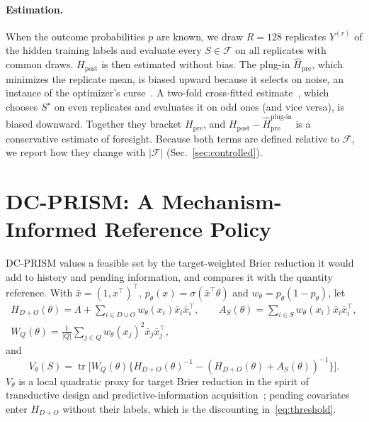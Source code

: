 \documentclass[runningheads]{llncs}
\begin{document}
\paragraph{Estimation.} When the outcome probabilities $p$ are known, we draw $R=128$ replicates $Y^{(r)}$ of the hidden training labels and evaluate every $S\in\mathcal F$ on all replicates with common draws. $H_{\mathrm{post}}$ is then estimated without bias. The plug-in $\widehat H_{\mathrm{pre}}$, which minimizes the replicate mean, is biased upward because it selects on noise, an instance of the optimizer's curse~\cite{smith2006optimizer,cawley2010overfitting}. A two-fold cross-fitted estimate~\cite{chernozhukov2018double}, which chooses $S^\star$ on even replicates and evaluates it on odd ones (and vice versa), is biased downward. Together they bracket $H_{\mathrm{pre}}$, and $H_{\mathrm{post}}-\widehat H_{\mathrm{pre}}^{\text{plug-in}}$ is a conservative estimate of foresight. Because both terms are defined relative to $\mathcal F$, we report how they change with $|\mathcal F|$ (Sec.~\ref{sec:controlled}).

\section{DC-PRISM: A Mechanism-Informed Reference Policy}
\label{sec:policy}
DC-PRISM values a feasible set by the target-weighted Brier reduction it would add to history and pending information, and compares it with the quantity reference. With $\bar x=(1,x^\top)^\top$, $p_\theta(x)=\sigma(\bar x^\top\theta)$ and $w_\theta=p_\theta(1-p_\theta)$, let
\begin{gather*}
 H_{D+O}(\theta)=\Lambda+\!\!\sum_{i\in D\cup O}\!\!w_\theta(x_i)\bar x_i\bar x_i^\top,\qquad
 A_S(\theta)=\sum_{i\in S}w_\theta(x_i)\bar x_i\bar x_i^\top,\\
 W_Q(\theta)=\tfrac1{|Q|}\sum_{j\in Q}w_\theta(x_j)^2\bar x_j\bar x_j^\top,
\end{gather*}
and
\begin{equation}
 V_\theta(S)=\operatorname{tr}\!\big[W_Q(\theta)\{H_{D+O}(\theta)^{-1}-(H_{D+O}(\theta)+A_S(\theta))^{-1}\}\big].\label{eq:value}
\end{equation}
$V_\theta$ is a local quadratic proxy for target Brier reduction in the spirit of transductive design and predictive-information acquisition~\cite{yu2006transductive,bickfordsmith2023prediction}; pending covariates enter $H_{D+O}$ without their labels, which is the discounting in~\eqref{eq:threshold}.
\end{document}
